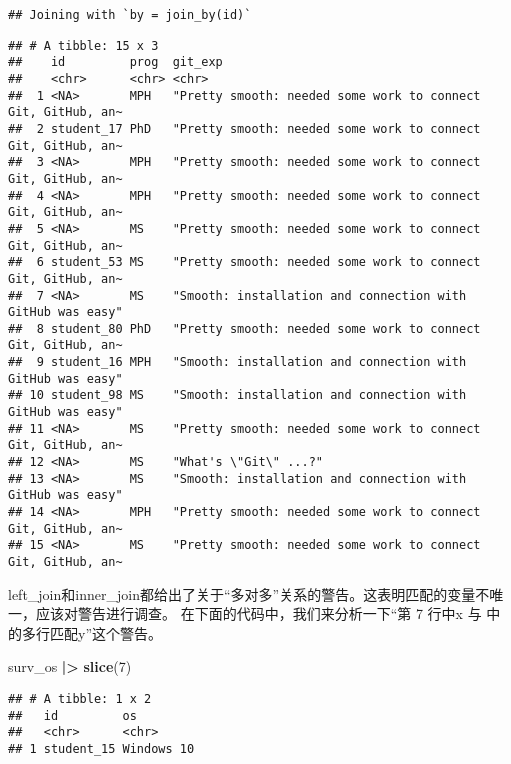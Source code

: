 \documentclass[
]{article}
\newenvironment{Shaded}{\begin{snugshade}}{\end{snugshade}}
\newcommand{\DecValTok}[1]{\textcolor[rgb]{0.00,0.00,0.81}{#1}}
\newcommand{\FunctionTok}[1]{\textcolor[rgb]{0.13,0.29,0.53}{\textbf{#1}}}
\newcommand{\NormalTok}[1]{#1}
\newcommand{\SpecialCharTok}[1]{\textcolor[rgb]{0.81,0.36,0.00}{\textbf{#1}}}
\begin{document}
\begin{verbatim}
## Joining with `by = join_by(id)`
\end{verbatim}

\begin{verbatim}
## # A tibble: 15 x 3
##    id         prog  git_exp                                                     
##    <chr>      <chr> <chr>                                                       
##  1 <NA>       MPH   "Pretty smooth: needed some work to connect Git, GitHub, an~
##  2 student_17 PhD   "Pretty smooth: needed some work to connect Git, GitHub, an~
##  3 <NA>       MPH   "Pretty smooth: needed some work to connect Git, GitHub, an~
##  4 <NA>       MPH   "Pretty smooth: needed some work to connect Git, GitHub, an~
##  5 <NA>       MS    "Pretty smooth: needed some work to connect Git, GitHub, an~
##  6 student_53 MS    "Pretty smooth: needed some work to connect Git, GitHub, an~
##  7 <NA>       MS    "Smooth: installation and connection with GitHub was easy"  
##  8 student_80 PhD   "Pretty smooth: needed some work to connect Git, GitHub, an~
##  9 student_16 MPH   "Smooth: installation and connection with GitHub was easy"  
## 10 student_98 MS    "Smooth: installation and connection with GitHub was easy"  
## 11 <NA>       MS    "Pretty smooth: needed some work to connect Git, GitHub, an~
## 12 <NA>       MS    "What's \"Git\" ...?"                                       
## 13 <NA>       MS    "Smooth: installation and connection with GitHub was easy"  
## 14 <NA>       MPH   "Pretty smooth: needed some work to connect Git, GitHub, an~
## 15 <NA>       MS    "Pretty smooth: needed some work to connect Git, GitHub, an~
\end{verbatim}

left\_join和inner\_join都给出了关于``多对多''关系的警告。这表明匹配的变量不唯一，应该对警告进行调查。
在下面的代码中，我们来分析一下``第 7 行中x 与 中的多行匹配y''这个警告。

\begin{Shaded}
\begin{Highlighting}[]
\NormalTok{surv\_os }\SpecialCharTok{|\textgreater{}} \FunctionTok{slice}\NormalTok{(}\DecValTok{7}\NormalTok{)}
\end{Highlighting}
\end{Shaded}

\begin{verbatim}
## # A tibble: 1 x 2
##   id         os        
##   <chr>      <chr>     
## 1 student_15 Windows 10
\end{verbatim}
\end{document}
